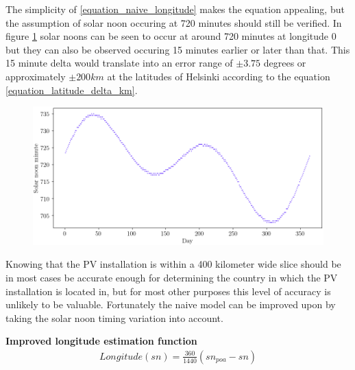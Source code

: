 \hfill \break


\noindent The simplicity of \ref{equation_naive_longitude} makes the equation appealing, but the assumption of solar noon occuring at 720 minutes should still be verified. In figure \ref{fig_solarnoons} solar noons can be seen to occur at around 720 minutes at longitude 0 but they can also be observed occuring 15 minutes earlier or later than that. This 15 minute delta would translate into an error range of $\pm 3.75$ degrees or approximately $\pm 200 km$ at the latitudes of Helsinki according to the equation \ref{equation_latitude_delta_km}.

\begin{figure}[ht!]
\centering
\includegraphics[width=1\linewidth]{pics/solarnoons2}
\label{fig_solarnoons}
\end{figure}



Knowing that the PV installation is within a 400 kilometer wide slice should be in most cases be accurate enough for determining the country in which the PV installation is located in, but for most other purposes this level of accuracy is unlikely to be valuable. Fortunately the naive model can be improved upon by taking the solar noon timing variation into account. \hfill \break


\newpage
\noindent\textbf{Improved longitude estimation function }
%
\begin{equation}
\begin{split}
\label{equation_longitude_estimation_2}
Longitude(sn)= \frac{360}{1440}(sn_{poa}-sn)
\end{split}
\end{equation}


